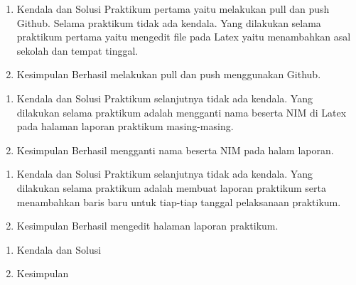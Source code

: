 
\begin{enumerate}
\item Kendala dan Solusi
\newline Praktikum pertama yaitu melakukan pull dan push Github. Selama praktikum tidak ada kendala. Yang dilakukan selama praktikum pertama yaitu mengedit file pada Latex yaitu menambahkan asal sekolah dan tempat tinggal.


\item Kesimpulan
\newline Berhasil melakukan pull dan push menggunakan Github. 


\end{enumerate}

\begin{enumerate}
\item Kendala dan Solusi
\newline Praktikum selanjutnya tidak ada kendala. Yang dilakukan selama praktikum adalah mengganti nama beserta NIM di Latex pada halaman laporan praktikum masing-masing.

\item Kesimpulan
\newline Berhasil mengganti nama beserta NIM pada halam laporan.

\end{enumerate}


\begin{enumerate}
\item Kendala dan Solusi
\newline Praktikum selanjutnya tidak ada kendala. Yang dilakukan selama praktikum adalah membuat laporan praktikum serta menambahkan baris baru untuk tiap-tiap tanggal pelaksanaan praktikum.

\item Kesimpulan
\newline Berhasil mengedit halaman laporan praktikum.

\end{enumerate}


\begin{enumerate}
\item Kendala dan Solusi


\item Kesimpulan


\end{enumerate}


